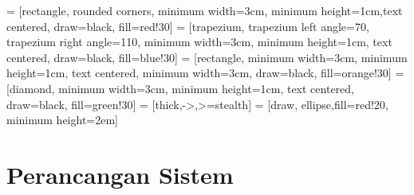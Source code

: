  = [rectangle, rounded corners, minimum width=3cm, minimum height=1cm,text centered, draw=black, fill=red!30]
 = [trapezium, trapezium left angle=70, trapezium right angle=110, minimum width=3cm, minimum height=1cm, text centered, draw=black, fill=blue!30]
 = [rectangle, minimum width=3cm, minimum height=1cm, text centered, minimum width=3cm, draw=black, fill=orange!30]
 = [diamond, minimum width=3cm, minimum height=1cm, text centered, draw=black, fill=green!30]
 = [thick,->,>=stealth]
 = [draw, ellipse,fill=red!20, minimum height=2em]

\chapter{Perancangan Sistem}




